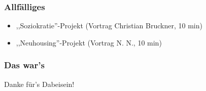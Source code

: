 \documentclass[17pt]{beamer}
\begin{document}
\begin{frame}
	\frametitle{Allfälliges}
	\begin{itemize}
		\item ,,Soziokratie''-Projekt (Vortrag Christian Bruckner, 10 min)
		\item ,,Neuhousing''-Projekt (Vortrag N. N., 10 min)
	\end{itemize}
\end{frame}



\begin{frame}
	\frametitle{Das war's}
	Danke für's Dabeisein!
\end{frame}

\end{document}
